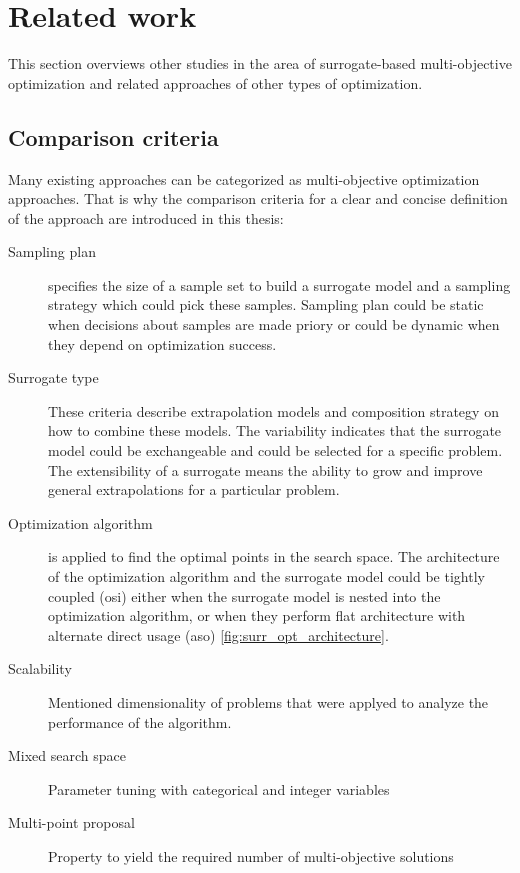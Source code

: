 \chapter{Related work}\label{sec:related}

    This section overviews other studies in the area of surrogate-based multi-objective optimization and related approaches of other types of optimization.


    \section{Comparison criteria}
        Many existing approaches can be categorized as multi-objective optimization approaches. That is why the comparison criteria for a clear and concise definition of the approach are introduced in this thesis:
        \begin{description}
            \item[Sampling plan] specifies the size of a sample set to build a surrogate model and a sampling strategy which could pick these samples. Sampling plan could be static when decisions about samples are made priory or could be dynamic when they depend on optimization success.
            \item[Surrogate type] These criteria describe extrapolation models and composition strategy on how to combine these models. The variability indicates that the surrogate model could be exchangeable and could be selected for a specific problem. The extensibility of a surrogate means the ability to grow and improve general extrapolations for a particular problem.
            \item[Optimization algorithm] is applied to find the optimal points in the search space. The architecture of the optimization algorithm and the surrogate model could be tightly coupled (\gls{osi}) either when the surrogate model is nested into the optimization algorithm, or when they perform flat architecture with alternate direct usage (\gls{aso}) \ref{fig:surr_opt_architecture}.
            \item[Scalability] Mentioned dimensionality of problems that were applyed to analyze the performance of the algorithm.
            \item[Mixed search space] Parameter tuning with categorical and integer variables
            \item[Multi-point proposal] Property to yield the required number of multi-objective solutions 
        \end{description}

